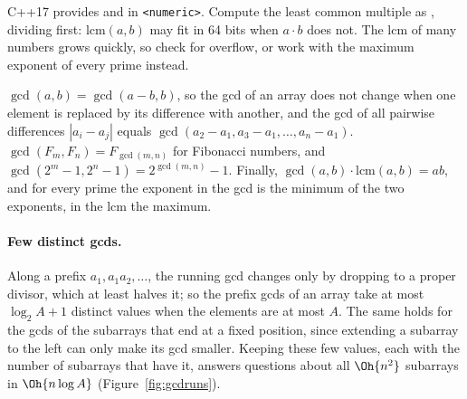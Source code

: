 C++17 provides  and  in \texttt{<numeric>}. Compute the least common multiple as ,
dividing first: $\mathrm{lcm}(a, b)$ may fit in 64 bits when $a \cdot b$ does not. The lcm of many numbers grows quickly, so check for
overflow, or work with the maximum exponent of every prime instead.

\begin{fact}
$\gcd(a, b) = \gcd(a - b, b)$, so the gcd of an array does not change when one element is replaced by its difference with another, and
the gcd of all pairwise differences $|a_i - a_j|$ equals $\gcd(a_2 - a_1, a_3 - a_1, \dots, a_n - a_1)$. $\gcd(F_m, F_n) = F_{\gcd(m,
n)}$ for Fibonacci numbers, and $\gcd(2^m - 1, 2^n - 1) = 2^{\gcd(m, n)} - 1$. Finally, $\gcd(a, b) \cdot \mathrm{lcm}(a, b) = ab$,
and for every prime the exponent in the gcd is the minimum of the two exponents, in the lcm the maximum.
\end{fact}

\paragraph{Few distinct gcds.} Along a prefix $a_1, a_1 a_2, \dots$, the running gcd changes only by dropping to a proper divisor, which
at least halves it; so the prefix gcds of an array take at most $\log_2 A + 1$ distinct values when the elements are at most $A$. The
same holds for the gcds of the subarrays that end at a fixed position, since extending a subarray to the left can only make its gcd
smaller. Keeping these few values, each with the number of subarrays that have it, answers questions about all $\Oh{n^2}$ subarrays
in $\Oh{n \log A}$ (Figure~\ref{fig:gcdruns}).

